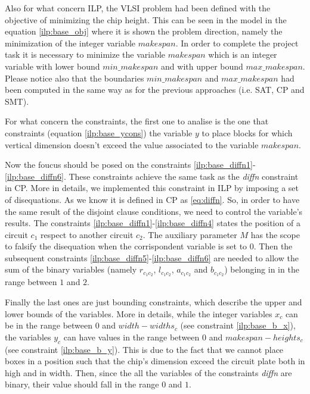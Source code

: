     Also for what concern ILP, the VLSI problem had been defined with the objective of minimizing 
    the chip height. This can be seen in the model in the equation \ref{ilp:base_obj} where it is
    shown the problem direction, namely the minimization of the integer variable $makespan$.
    In order to complete the project task it is necessary to minimize the variable $makespan$ which
    is an integer variable with lower bound $min\_makespan$ and with upper bound $max\_makespan$.
    Please notice also that the  boundaries $min\_makespan$ and $max\_makespan$ had been computed
    in the same way as for the previous approaches (i.e. SAT, CP and SMT).

    For what concern the constraints, the first one to analise is the one that constraints
    (equation \ref{ilp:base_ycons}) the variable $y$ to place blocks for which vertical dimension
    doesn't exceed the value associated to the variable $makespan$.

    Now the foucus should be posed on the constraints \ref{ilp:base_diffn1}-\ref{ilp:base_diffn6}.
    These constraints achieve the same task as the \textit{diffn} constraint in CP. More in
    details, we implemented this constraint in ILP by imposing a set of disequations. As we know
    it is defined in CP as \ref{eq:diffn}. So, in order to have the same result of the disjoint
    clause conditions, we need to control the variable's results. The constraints 
    \ref{ilp:base_diffn1}-\ref{ilp:base_diffn4} states the position of a circuit $c_1$ respect to
    another circuit $c_2$. The auxiliary parameter $M$ has the scope to falsify the disequation
    when the corrispondent variable is set to 0. Then the subsequent constraints 
    \ref{ilp:base_diffn5}-\ref{ilp:base_diffn6} are needed to allow the sum of the binary variables 
    (namely $r_{c_1c_2}$, $l_{c_1c_2}$, $a_{c_1c_2}$ and $b_{c_1c_2}$) belonging in in the range
    between $1$ and $2$. 
    
    Finally the last ones are just bounding constraints, which describe the upper and lower bounds
    of the variables. More in details, while the integer variables $x_c$ can be in the range 
    between $0$ and $width-widths_c$ (see constraint \ref{ilp:base_b_x}), the variables $y_c$ can have
    values in the range between $0$ and $makespan-heights_c$ (see constraint \ref{ilp:base_b_y}). 
    This is due to the fact that we cannot place boxes in a position such that the chip's dimension 
    exceed the circuit plate both in high and in width. Then, since the all the variables of the 
    constraints \textit{diffn} are binary, their value should fall in the range $0$ and $1$.

